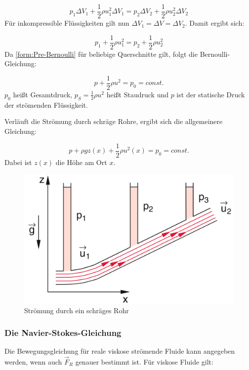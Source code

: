 \begin{equation}
p_1 \Delta V_1 + \frac{1}{2} \rho u_1^2 \Delta V_1 = p_2 \Delta V_2 + \frac{1}{2} \rho u_2^2 \Delta V_2
\end{equation}
Für inkompressible Flüssigkeiten gilt nun $ \Delta V_1 = \Delta V = \Delta V_2 $. Damit ergibt sich:

\begin{equation}
p_1 + \frac{1}{2} \rho u_1^2 = p_2 + \frac{1}{2} \rho u_2^2
\label{form:Pre-Bernoulli}
\end{equation}
Da \ref{form:Pre-Bernoulli} für beliebige Querschnitte gilt, folgt die Bernoulli-Gleichung:

\begin{equation}
\boxed{p + \frac{1}{2} \rho u^2 = p_0 = const.}
\label{form:Bernoulli-Gleichung}
\end{equation}
$ p_0 $ heißt Gesamtdruck, $ p_S = \frac{1}{2} \rho u^2 $ heißt Staudruck und $p$ ist der statische Druck der strömenden Flüssigkeit.

Verläuft die Strömung durch schräge Rohre, ergibt sich die allgemeinere Gleichung:

\begin{equation}
p + \rho g z(x) + \frac{1}{2} \rho u^2(x) = p_0 = const.
\end{equation}
Dabei ist $z(x)$ die Höhe am Ort $x$.

\begin{figure}
        \includegraphics[width=.9\textwidth]{images/8-11}
\caption{ Strömung durch ein schräges Rohr }
\label{fig:8-11}
\end{figure}

\subsubsection{Die Navier-Stokes-Gleichung}
Die Bewegungsgleichung für reale viskose strömende Fluide kann angegeben werden, wenn auch $ \vec{F}_R $ genauer bestimmt ist. Für viskose Fluide gilt:

